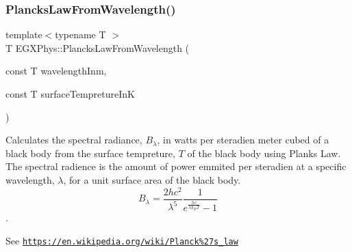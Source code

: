 \subsubsection{\texorpdfstring{Plancks\+Law\+From\+Wavelength()}{PlancksLawFromWavelength()}}
{\footnotesize\ttfamily template$<$typename T $>$ \\
T E\+G\+X\+Phys\+::\+Plancks\+Law\+From\+Wavelength (\begin{DoxyParamCaption}\item[{const T}]{wavelength\+Inm,  }\item[{const T}]{surface\+Tempreture\+InK }\end{DoxyParamCaption})}



Calculates the spectral radiance, $B_{\lambda}$, in watts per steradien meter cubed of a black body from the surface tempreture, $T$ of the black body using Plank\textquotesingle{}s Law. The spectral radience is the amount of power emmited per steradien at a specific wavelength, $\lambda$, for a unit surface area of the black body. \[ B_{\lambda} = \dfrac{2 h c^2}{\lambda^5} \dfrac{1}{e^{\frac{hc}{\lambda k_B T}} - 1} \]. 

See \href{https://en.wikipedia.org/wiki/Planck%27s_law}{\tt https\+://en.\+wikipedia.\+org/wiki/\+Planck\%27s\+\_\+law}


